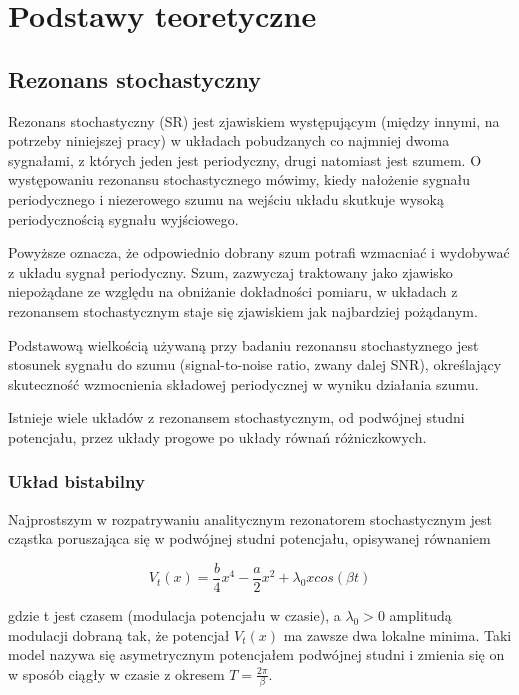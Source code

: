   \section{Podstawy teoretyczne}
  
  \subsection{Rezonans stochastyczny}
  
  Rezonans stochastyczny (SR) jest zjawiskiem występującym (między innymi, na potrzeby niniejszej pracy) w układach pobudzanych co najmniej dwoma sygnałami, z których jeden jest periodyczny, drugi natomiast jest szumem. O występowaniu rezonansu stochastycznego mówimy, kiedy nałożenie sygnału periodycznego i niezerowego szumu na wejściu układu skutkuje wysoką periodycznością sygnału wyjściowego.
  
  Powyższe oznacza, że odpowiednio dobrany szum potrafi wzmacniać i wydobywać z układu sygnał periodyczny. Szum, zazwyczaj traktowany jako zjawisko niepożądane ze względu na obniżanie dokładności pomiaru, w układach z rezonansem stochastycznym staje się zjawiskiem jak najbardziej pożądanym. 
  
  Podstawową wielkością używaną przy badaniu rezonansu stochastyznego jest stosunek sygnału do szumu (signal-to-noise ratio, zwany dalej SNR), określający skuteczność wzmocnienia składowej periodycznej w wyniku działania szumu.

  Istnieje wiele układów z rezonansem stochastycznym, od podwójnej studni potencjału, przez układy progowe po układy równań różniczkowych.

  \subsubsection{Układ bistabilny}
  \label{sec:uklad_bistabilny}

  Najprostszym w rozpatrywaniu analitycznym rezonatorem stochastycznym jest cząstka poruszająca się w  podwójnej studni potencjału, opisywanej równaniem \cite{mcnamara}

  \begin{equation} \label{sr:1}
    V_t(x) = \frac{b}{4} x^4 - \frac{a}{2} x^2 + \lambda_0 x cos(\beta t)
  \end{equation}

  gdzie t jest czasem (modulacja potencjału w czasie), a $\lambda_0 > 0$ amplitudą modulacji dobraną tak, że potencjał $V_t(x)$ ma zawsze dwa lokalne minima. Taki model nazywa się asymetrycznym potencjałem podwójnej studni i zmienia się on w sposób ciągły w czasie z okresem $T = \frac{2 \pi}{\beta}$.

